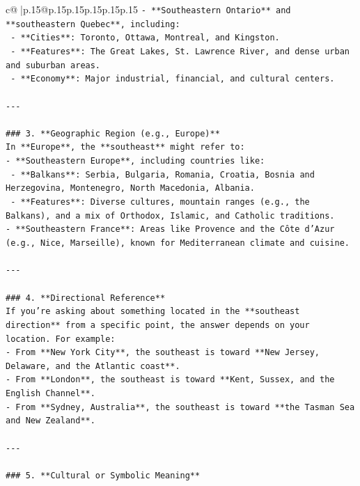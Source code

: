 \documentclass{article}
\begin{document}
{\begin{supertabular}{c@{$\;$}|p{.15\linewidth}@{}p{.15\linewidth}p{.15\linewidth}p{.15\linewidth}p{.15\linewidth}p{.15\linewidth}}
{{{\texttt{{-} **Southeastern Ontario** and **southeastern Quebec**, including:} \\
\texttt{  {-} **Cities**: Toronto, Ottawa, Montreal, and Kingston.} \\
\texttt{  {-} **Features**: The Great Lakes, St. Lawrence River, and dense urban and suburban areas.} \\
\texttt{  {-} **Economy**: Major industrial, financial, and cultural centers.} \\
\\ 
\texttt{{-}{-}{-}} \\
\\ 
\texttt{\#\#\# 3. **Geographic Region (e.g., Europe)**} \\
\texttt{In **Europe**, the **southeast** might refer to:} \\
\texttt{{-} **Southeastern Europe**, including countries like:} \\
\texttt{  {-} **Balkans**: Serbia, Bulgaria, Romania, Croatia, Bosnia and Herzegovina, Montenegro, North Macedonia, Albania.} \\
\texttt{  {-} **Features**: Diverse cultures, mountain ranges (e.g., the Balkans), and a mix of Orthodox, Islamic, and Catholic traditions.} \\
\texttt{{-} **Southeastern France**: Areas like Provence and the Côte d’Azur (e.g., Nice, Marseille), known for Mediterranean climate and cuisine.} \\
\\ 
\texttt{{-}{-}{-}} \\
\\ 
\texttt{\#\#\# 4. **Directional Reference**} \\
\texttt{If you're asking about something located in the **southeast direction** from a specific point, the answer depends on your location. For example:} \\
\texttt{{-} From **New York City**, the southeast is toward **New Jersey, Delaware, and the Atlantic coast**.} \\
\texttt{{-} From **London**, the southeast is toward **Kent, Sussex, and the English Channel**.} \\
\texttt{{-} From **Sydney, Australia**, the southeast is toward **the Tasman Sea and New Zealand**.} \\
\\ 
\texttt{{-}{-}{-}} \\
\\ 
\texttt{\#\#\# 5. **Cultural or Symbolic Meaning**} \\
}}}
\end{supertabular}}
\end{document}
